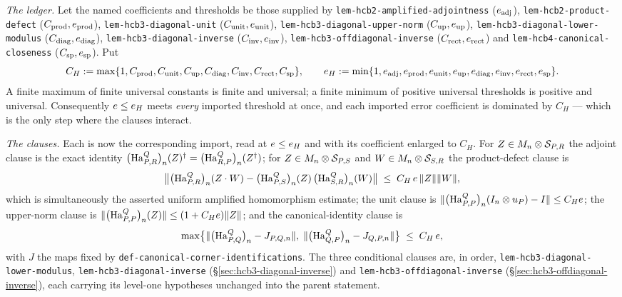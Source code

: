 \emph{The ledger.} Let the named coefficients and thresholds be those supplied by
\texttt{lem-hcb2-amplified-adjointness} ($e_{\mathrm{adj}}$),
\texttt{lem-hcb2-product-defect} ($C_{\mathrm{prod}},e_{\mathrm{prod}}$),
\texttt{lem-hcb3-diagonal-unit} ($C_{\mathrm{unit}},e_{\mathrm{unit}}$),
\texttt{lem-hcb3-diagonal-upper-norm} ($C_{\mathrm{up}},e_{\mathrm{up}}$),
\texttt{lem-hcb3-diagonal-lower-modulus} ($C_{\mathrm{diag}},e_{\mathrm{diag}}$),
\texttt{lem-hcb3-diagonal-inverse} ($C_{\mathrm{inv}},e_{\mathrm{inv}}$),
\texttt{lem-hcb3-offdiagonal-inverse} ($C_{\mathrm{rect}},e_{\mathrm{rect}}$) and
\texttt{lem-hcb4-canonical-closeness} ($C_{\mathrm{sp}},e_{\mathrm{sp}}$). Put
\begin{equation}\label{eq:hcb-ledger}
  C_H:=\max\{1,C_{\mathrm{prod}},C_{\mathrm{unit}},C_{\mathrm{up}},C_{\mathrm{diag}},
             C_{\mathrm{inv}},C_{\mathrm{rect}},C_{\mathrm{sp}}\},
  \qquad
  e_H:=\min\{1,e_{\mathrm{adj}},e_{\mathrm{prod}},e_{\mathrm{unit}},
             e_{\mathrm{up}},e_{\mathrm{diag}},e_{\mathrm{inv}},
             e_{\mathrm{rect}},e_{\mathrm{sp}}\}.
\end{equation}
A finite maximum of finite universal constants is finite and universal; a finite minimum
of positive universal thresholds is positive and universal. Consequently $e\le
e_H$ meets \emph{every} imported threshold at once, and each imported error
coefficient is dominated by $C_H$ --- which is the only step where the clauses interact.

\emph{The clauses.} Each is now the corresponding import, read at $e\le e_H$ and
with its coefficient enlarged to $C_H$. For $Z\in M_{n}\otimes \mathcal S_{P,R}$ the adjoint clause
is the exact identity $\bigl(\mathrm{Ha}^{Q}_{P,R}\bigr)_{n}(Z)^{\dagger}=\bigl(\mathrm{Ha}^{Q}_{R,P}\bigr)_{n}(Z^{\dagger})$; for
$Z\in M_{n}\otimes \mathcal S_{P,S}$ and $W\in M_{n}\otimes \mathcal S_{S,R}$ the product-defect clause is
\begin{equation}\label{eq:hcb-prod}
  \bigl\lVert\bigl(\mathrm{Ha}^{Q}_{P,R}\bigr)_{n}(Z\mathbin{\cdot} W)-\bigl(\mathrm{Ha}^{Q}_{P,S}\bigr)_{n}(Z)\,\bigl(\mathrm{Ha}^{Q}_{S,R}\bigr)_{n}(W)\bigr\rVert
  \;\le\;C_H\,e\,\lVert Z\rVert\lVert W\rVert,
\end{equation}
which is simultaneously the asserted uniform amplified homomorphism estimate; the unit
clause is $\lVert\bigl(\mathrm{Ha}^{Q}_{P,P}\bigr)_{n}(I_{n}\otimes u_{P})-I\rVert\le C_He$; the
upper-norm clause is $\lVert\bigl(\mathrm{Ha}^{Q}_{P,P}\bigr)_{n}(Z)\rVert\le(1+C_He)\lVert Z\rVert$; and the
canonical-identity clause is
\[
  \max\bigl\{\lVert\bigl(\mathrm{Ha}^{Q}_{P,Q}\bigr)_{n}-J_{P,Q,n}\rVert,\;
             \lVert\bigl(\mathrm{Ha}^{Q}_{Q,P}\bigr)_{n}-J_{Q,P,n}\rVert\bigr\}\;\le\;C_H\,e,
\]
with $J$ the maps fixed by \texttt{def-canonical-corner-identifications}. The three
conditional clauses are, in order, \texttt{lem-hcb3-diagonal-lower-modulus},
\texttt{lem-hcb3-diagonal-inverse} (\S\ref{sec:hcb3-diagonal-inverse}) and
\texttt{lem-hcb3-offdiagonal-inverse} (\S\ref{sec:hcb3-offdiagonal-inverse}), each
carrying its level-one hypotheses unchanged into the parent statement.

